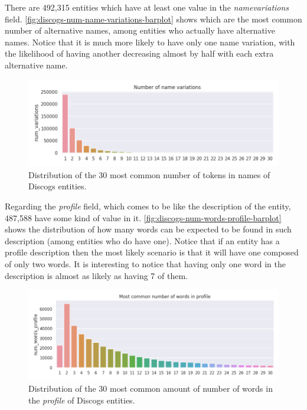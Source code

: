 \documentclass[epsfig,a4paper,11pt,titlepage,twoside,openany]{book}
\begin{document}
There are 492,315 entities which have at least one value in the \textit{namevariations} field. \autoref{fig:discogs-num-name-variations-barplot} shows which are the most common number of alternative names, among entities who actually have alternative names. Notice that it is much more likely to have only one name variation, with the likelihood of having another decreasing almost by half with each extra alternative name.

\begin{figure}[H]
  \centering \includegraphics[width=\textwidth]{discogs_num_name_variations} 
  \caption{Distribution of the 30 most common number of tokens in names of Discogs entities.}
  \label{fig:discogs-num-name-variations-barplot}
\end{figure}


Regarding the \textit{profile} field, which comes to be like the description of the entity, 487,588 have some kind of value in it. \autoref{fig:discogs-num-words-profile-barplot} shows the distribution of how many words can be expected to be found in such description (among entities who do have one). Notice that if an entity has a profile description then the most likely scenario is that it will have one composed of only two words. It is interesting to notice that having only one word in the description is almost as likely as having 7 of them. 

\begin{figure}[H]
  \centering \includegraphics[width=\textwidth]{discogs_num_words_profile} 
  \caption{Distribution of the 30 most common amount of number of words in the \textit{profile} of Discogs entities.}
  \label{fig:discogs-num-words-profile-barplot}
\end{figure}
\end{document}
